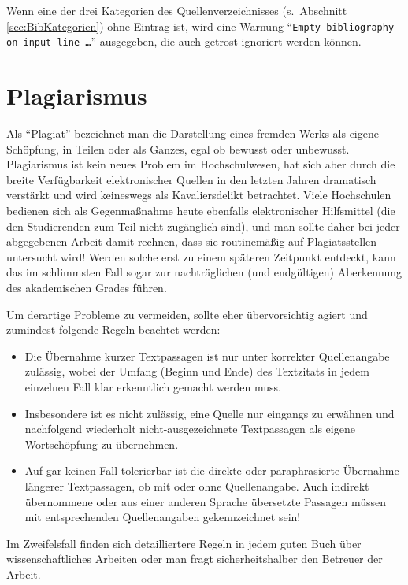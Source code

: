 Wenn eine der drei Kategorien des Quellenverzeichnisses (s.~Abschnitt \ref{sec:BibKategorien})
ohne Eintrag ist, wird eine Warnung "`\texttt{Empty bibliography on input line \ldots}"' ausgegeben, die auch getrost ignoriert werden können.




\section{Plagiarismus}
\label{sec:Plagiarismus}

Als "`Plagiat"' bezeichnet man die Darstellung eines fremden Werks als eigene Schöpfung, 
in Teilen oder als Ganzes, egal ob bewusst oder unbewusst.
Plagiarismus ist kein neues Problem im Hochschulwesen, hat sich aber durch die 
breite Verfügbarkeit elektronischer Quellen in den letzten Jahren dramatisch 
verstärkt und wird keineswegs als Kavaliersdelikt betrachtet.
Viele Hochschulen bedienen sich als Gegenmaßnahme heute ebenfalls elektronischer Hilfsmittel 
(die den Studierenden zum Teil nicht zugänglich sind), und man sollte daher bei jeder 
abgegebenen Arbeit damit rechnen, dass sie routinemäßig auf Plagiatsstellen untersucht wird!
Werden solche erst zu einem späteren Zeitpunkt entdeckt, kann das im schlimmsten Fall sogar 
zur nachträglichen (und endgültigen) Aberkennung des akademischen Grades führen.

Um derartige Probleme zu vermeiden, sollte eher übervorsichtig agiert und zumindest folgende Regeln beachtet werden:
%
\begin{itemize}
\item
Die Übernahme kurzer Textpassagen ist nur unter korrekter Quellenangabe zulässig, wobei der Umfang (Beginn und Ende) des Textzitats in jedem einzelnen Fall klar erkenntlich gemacht werden muss. 
\item
Insbesondere ist es nicht zulässig, eine Quelle nur eingangs zu erwähnen und nachfolgend wiederholt nicht-ausgezeichnete Textpassagen als eigene Wortschöpfung zu übernehmen. 
\item
Auf gar keinen Fall tolerierbar ist die direkte oder paraphrasierte Übernahme längerer Textpassagen, ob mit oder ohne Quellenangabe. Auch indirekt übernommene oder aus einer anderen Sprache übersetzte Passagen müssen mit entsprechenden Quellenangaben gekennzeichnet sein! 
\end{itemize}
%
Im Zweifelsfall finden sich detailliertere Regeln in jedem guten Buch über wissenschaftliches Arbeiten oder man fragt sicherheitshalber den Betreuer der Arbeit.


